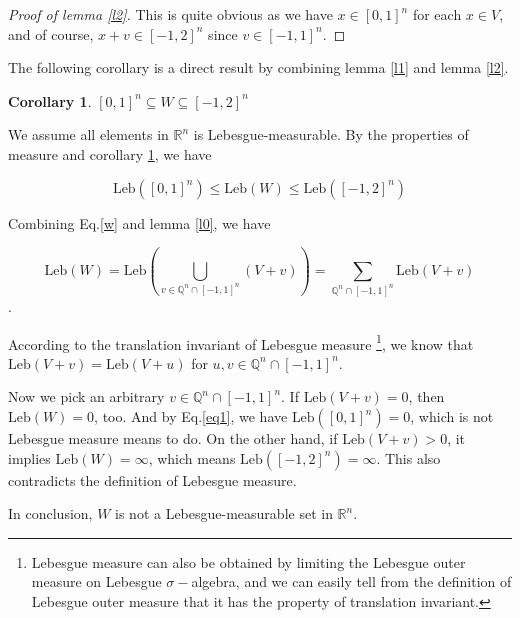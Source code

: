 \documentclass[12pt]{article}
\newcommand\bQ{\mathbb{Q}}
\newcommand\bR{\mathbb{R}}
\newcommand{\leb}{\text{Leb}}
\newtheorem{corollary}{Corollary}
\begin{document}
	\begin{proof}[Proof of lemma \ref{l2}]
		This is quite obvious as we have $x\in[0,1]^n$ for each $x\in V$, and of course, $x+v\in [-1,2]^n$ since $v\in [-1,1]^n$.
	\end{proof}

	The following corollary is a direct result by combining lemma \ref{l1} and lemma \ref{l2}.
	\begin{corollary}\label{c1}
		$[0,1]^n\subseteq W\subseteq [-1,2]^n$
	\end{corollary}
	
	We assume all elements in $\bR^n$ is Lebesgue-measurable. By the properties of measure and corollary \ref{c1}, we have
	
	\begin{equation}\label{eq1}
		\leb([0,1]^n) \le \leb(W) \le \leb([-1,2]^n)
	\end{equation}
	
	Combining Eq.\ref{w} and lemma \ref{l0}, we have 
	
	$$\leb(W)=\leb(\bigcup_{v\in  \bQ^n\cap[-1,1]^n} (V+v))=\sum_{\bQ^n\cap[-1,1]^n}\leb(V+v)$$.
	
	According to the translation invariant of Lebesgue measure
	\footnote{Lebesgue measure can also be obtained by limiting the Lebesgue outer measure on Lebesgue $\sigma-$algebra, and we can easily tell from the definition of Lebesgue outer measure that it has the property of translation invariant.},
	we know that $\leb(V+v)=\leb(V+u)$ for $u,v\in\bQ^n\cap[-1,1]^n$. 
	
	Now we pick an arbitrary $v\in\bQ^n\cap[-1,1]^n$. If $\leb(V+v)=0$, then $\leb(W)=0$, too. And by Eq.\ref{eq1}, we have $\leb([0,1]^n)=0$, which is not Lebesgue measure means to do. On the other hand, if $\leb(V+v)>0$, it implies $\leb(W)=\infty$, which means $\leb([-1,2]^n)=\infty$. This also contradicts the definition of Lebesgue measure.
	
	In conclusion, $W$ is not a Lebesgue-measurable set in $\bR^n$.
	
\end{document}
